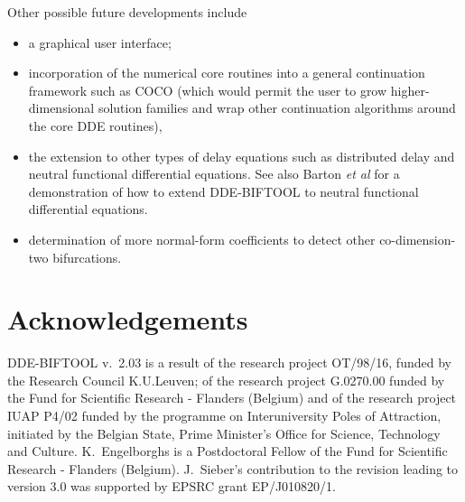 \documentclass[10pt]{scrartcl}
\newcommand{\DDEBIFCODE}{\textsc{DDE-BIFTOOL}}
\newcommand{\demobase}{\url{../demos/index.html}}
\newcommand{\blist}[1]{\mbox{\lstinline!#1!}}
\begin{document}
{Other possible future developments include
\begin{itemize}
\item a graphical user interface;
\item incorporation of the numerical core
  routines into a general continuation framework such as \textsc{COCO}
  \cite{DS13} (which would permit the user to grow higher-dimensional
  solution families and wrap other continuation algorithms around the
  core DDE routines),
\item the extension to other types of delay equations such as
  distributed delay and neutral functional differential equations. See
  also Barton \emph{et al} \cite{Barton06} for a demonstration of how
  to extend \DDEBIFCODE{} to neutral functional differential
  equations.
\item determination of more normal-form coefficients to detect
  other co-dimension-two bifurcations.
\end{itemize}
\section*{Acknowledgements}

\DDEBIFCODE{} v.~2.03 is a result of the research project OT/98/16,
funded by the Research Council K.U.Leuven; of the research project
G.0270.00 funded by the Fund for Scientific Research - Flanders
(Belgium) and of the research project IUAP P4/02 funded by the
programme on Interuniversity Poles of Attraction, initiated by the
Belgian State, Prime Minister's Office for Science, Technology and
Culture.  K.~Engelborghs is a Postdoctoral Fellow of the Fund for
Scientific Research - Flanders (Belgium).  J.~Sieber's contribution to
the revision leading to version 3.0 was supported by EPSRC grant
EP/J010820/1.





\newpage
\appendix


}
\end{document}
